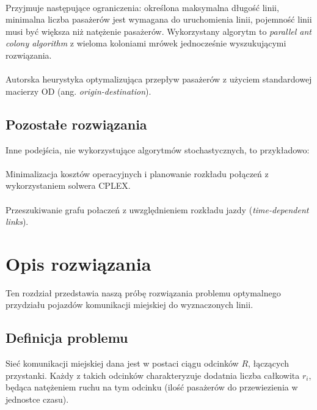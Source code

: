\documentclass[a4paper]{article}
\begin{document}
\paragraph{\cite{bib-ant-colony}}
Przyjmuje następujące ograniczenia: określona maksymalna długość linii, minimalna liczba pasażerów jest wymagana do uruchomienia linii, pojemność linii musi być większa niż natężenie pasażerów. Wykorzystany algorytm to \textit{parallel ant colony algorithm} z wieloma koloniami mrówek jednocześnie wyszukującymi rozwiązania.

\paragraph{\cite{bib-transit-oriented}}
Autorska heurystyka optymalizująca przepływ pasażerów z użyciem standardowej macierzy OD (ang. \textit{origin-destination}).

\subsection{Pozostałe rozwiązania}
Inne podejścia, nie wykorzystujące algorytmów stochastycznych, to przykładowo:

\paragraph{\cite{bib-route-optimization}}
Minimalizacja kosztów operacyjnych i planowanie rozkładu połączeń z wykorzystaniem solwera CPLEX.

\paragraph{\cite{bib-theoretical-framework}}
Przeszukiwanie grafu połaczeń z uwzględnieniem rozkładu jazdy (\textit{time-dependent links}).

\newpage




\section{Opis rozwiązania} \label{sec:solution}
Ten rozdział przedstawia naszą próbę rozwiązania problemu optymalnego przydziału pojazdów komunikacji miejskiej do wyznaczonych linii.

\subsection{Definicja problemu}
Sieć komunikacji miejskiej dana jest w postaci ciągu odcinków $R$, łączących przystanki. Każdy z takich odcinków charakteryzuje dodatnia liczba całkowita $r_i$, będąca natężeniem ruchu na tym odcinku (ilość pasażerów do przewiezienia w jednostce czasu).
\end{document}
